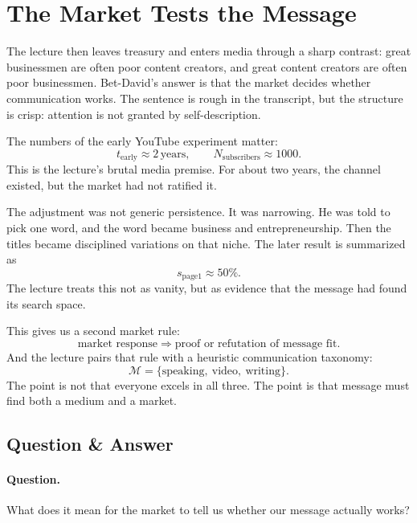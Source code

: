 \section{The Market Tests the Message}

The lecture then leaves treasury and enters media through a sharp contrast: great businessmen are often poor content creators, and great content creators are often poor businessmen. Bet-David's answer is that the market decides whether communication works. The sentence is rough in the transcript, but the structure is crisp: attention is not granted by self-description.

The numbers of the early YouTube experiment matter:
\begin{equation}
t_{\text{early}} \approx 2\,\text{years},\qquad
N_{\text{subscribers}} \approx 1000.
\end{equation}
This is the lecture's brutal media premise. For about two years, the channel existed, but the market had not ratified it.

The adjustment was not generic persistence. It was narrowing. He was told to pick one word, and the word became business and entrepreneurship. Then the titles became disciplined variations on that niche. The later result is summarized as
\begin{equation}
s_{\text{page1}} \approx 50\%.
\end{equation}
The lecture treats this not as vanity, but as evidence that the message had found its search space.

This gives us a second market rule:
\begin{equation}
\text{market response}\Rightarrow \text{proof or refutation of message fit}.
\end{equation}
And the lecture pairs that rule with a heuristic communication taxonomy:
\begin{equation}
\mathcal{M}=\{\text{speaking},\ \text{video},\ \text{writing}\}.
\end{equation}
The point is not that everyone excels in all three. The point is that message must find both a medium and a market.

\subsection{Question \& Answer}

\paragraph{Question.} What does it mean for the market to tell us whether our message actually works?

